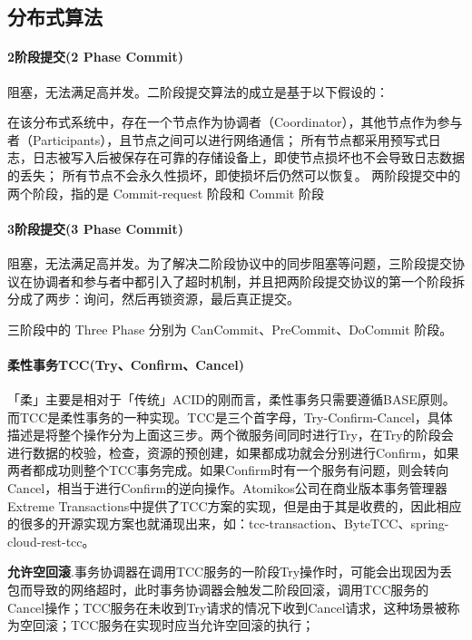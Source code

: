 \documentclass[../../../interview-questions.tex]{subfiles}
\begin{document}
\subsection{分布式算法}

\paragraph{2阶段提交(2 Phase Commit)}

阻塞，无法满足高并发。二阶段提交算法的成立是基于以下假设的：

在该分布式系统中，存在一个节点作为协调者（Coordinator），其他节点作为参与者（Participants），且节点之间可以进行网络通信；
所有节点都采用预写式日志，日志被写入后被保存在可靠的存储设备上，即使节点损坏也不会导致日志数据的丢失；
所有节点不会永久性损坏，即使损坏后仍然可以恢复。
两阶段提交中的两个阶段，指的是 Commit-request 阶段和 Commit 阶段

\paragraph{3阶段提交(3 Phase Commit)}

阻塞，无法满足高并发。为了解决二阶段协议中的同步阻塞等问题，三阶段提交协议在协调者和参与者中都引入了超时机制，并且把两阶段提交协议的第一个阶段拆分成了两步：询问，然后再锁资源，最后真正提交。

三阶段中的 Three Phase 分别为 CanCommit、PreCommit、DoCommit 阶段。

\paragraph{柔性事务TCC(Try、Confirm、Cancel)}

「柔」主要是相对于「传统」ACID的刚而言，柔性事务只需要遵循BASE原则。而TCC是柔性事务的一种实现。TCC是三个首字母，Try-Confirm-Cancel，具体描述是将整个操作分为上面这三步。两个微服务间同时进行Try，在Try的阶段会进行数据的校验，检查，资源的预创建，如果都成功就会分别进行Confirm，如果两者都成功则整个TCC事务完成。如果Confirm时有一个服务有问题，则会转向Cancel，相当于进行Confirm的逆向操作。Atomikos公司在商业版本事务管理器Extreme Transactions中提供了TCC方案的实现，但是由于其是收费的，因此相应的很多的开源实现方案也就涌现出来，如：tcc-transaction、ByteTCC、spring-cloud-rest-tcc。

\textbf{允许空回滚}.事务协调器在调用TCC服务的一阶段Try操作时，可能会出现因为丢包而导致的网络超时，此时事务协调器会触发二阶段回滚，调用TCC服务的Cancel操作；TCC服务在未收到Try请求的情况下收到Cancel请求，这种场景被称为空回滚；TCC服务在实现时应当允许空回滚的执行；
\end{document}
